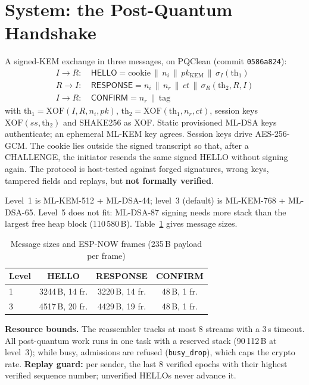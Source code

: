 \documentclass[conference]{IEEEtran}
\begin{document}
\section{System: the Post-Quantum Handshake}
A signed-KEM exchange in three messages, on PQClean (commit \texttt{0586a824}):
\begin{align*}
I\!\to\! R:&\ \textsf{HELLO}=\text{cookie}\,\|\,n_i\,\|\,pk_{\mathrm{KEM}}\,\|\,\sigma_I(\text{th}_1)\\
R\!\to\! I:&\ \textsf{RESPONSE}=n_i\,\|\,n_r\,\|\,ct\,\|\,\sigma_R(\text{th}_2, R, I)\\
I\!\to\! R:&\ \textsf{CONFIRM}=n_r\,\|\,\text{tag}
\end{align*}
with $\text{th}_1=\text{XOF}(I,R,n_i,pk)$, $\text{th}_2=\text{XOF}(\text{th}_1,n_r,ct)$, session keys
$\text{XOF}(ss,\text{th}_2)$ and SHAKE256 as XOF. Static provisioned ML-DSA keys authenticate; an ephemeral ML-KEM
key agrees. Session keys drive AES-256-GCM. The cookie lies outside the signed transcript so that, after a
CHALLENGE, the initiator resends the same signed HELLO without signing again. The protocol is host-tested against
forged signatures, wrong keys, tampered fields and replays, but \textbf{not formally verified}.

Level~1 is ML-KEM-512 + ML-DSA-44; level~3 (default) is ML-KEM-768 + ML-DSA-65. Level~5 does not fit: ML-DSA-87
signing needs more stack than the largest free heap block (110\,580\,B). Table~\ref{tab:sizes} gives message sizes.

\begin{table}[t]
\caption{Message sizes and ESP-NOW frames (235\,B payload per frame)}
\label{tab:sizes}
\centering\small
\begin{tabular}{lccc}
\toprule
Level & HELLO & RESPONSE & CONFIRM\\
\midrule
1 & 3244\,B, 14 fr. & 3220\,B, 14 fr. & 48\,B, 1 fr.\\
3 & 4517\,B, 20 fr. & 4429\,B, 19 fr. & 48\,B, 1 fr.\\
\bottomrule
\end{tabular}
\end{table}

\textbf{Resource bounds.} The reassembler tracks at most 8 streams with a 3\,s timeout. All post-quantum work runs in
one task with a reserved stack (90\,112\,B at level~3); while busy, admissions are refused (\texttt{busy\_drop}),
which caps the crypto rate. \textbf{Replay guard:} per sender, the last 8 verified epochs with their highest
verified sequence number; unverified HELLOs never advance it.
\end{document}

